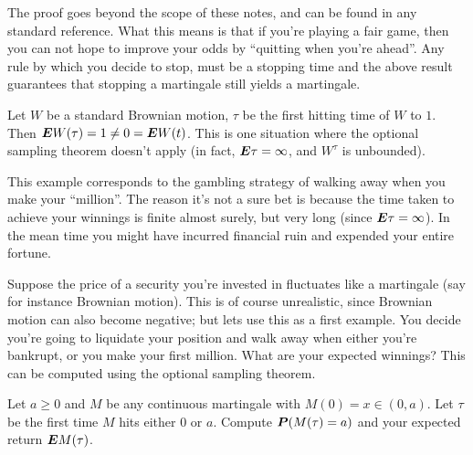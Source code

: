 The proof goes beyond the scope of these notes, and can be found in any standard reference.
What this means is that if you're playing a fair game, then you can not hope to improve your odds by ``quitting when you're ahead''.
Any rule by which you decide to stop, must be a stopping time and the above result guarantees that stopping a martingale still yields a martingale.

\begin{remark}
  Let $W$ be a standard Brownian motion, $\tau$ be the first hitting time of $W$ to $1$.
  Then $\E W(\tau) = 1 \neq 0 = \E W(t)$.
  This is one situation where the optional sampling theorem doesn't apply (in fact, $\E \tau = \infty$, and $W^\tau$ is unbounded).
  
  This example corresponds to the gambling strategy of walking away when you make your ``million''.
  The reason it's not a sure bet is because the time taken to achieve your winnings is finite almost surely, but very long (since $\E \tau = \infty$).
  In the mean time you might have incurred financial ruin and expended your entire fortune.
\end{remark}

Suppose the price of a security you're invested in fluctuates like a martingale (say for instance Brownian motion).
This is of course unrealistic, since Brownian motion can also become negative; but lets use this as a first example.
You decide you're going to liquidate your position and walk away when either you're bankrupt, or you make your first million.
What are your expected winnings?
This can be computed using the optional sampling theorem.

\begin{problem}
  Let $a \geq 0$ and $M$ be any continuous martingale with $M(0) = x \in (0, a)$.
  Let $\tau$ be the first time $M$ hits either $0$ or $a$.
  Compute $\P( M(\tau) = a )$ and your expected return $\E M(\tau)$.
\end{problem}


